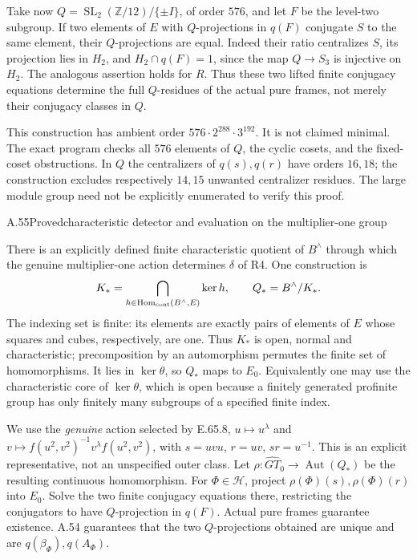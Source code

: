 Take now $Q=\operatorname{SL}_2(\mathbb Z/12)/\{\pm I\}$, of order
$576$, and let $F$ be the level-two subgroup. If two elements of $E$ with
$Q$-projections in $q(F)$ conjugate $S$ to the same element, their
$Q$-projections are equal. Indeed their ratio centralizes $S$, its
projection lies in $H_2$, and
$H_2\cap q(F)=1$, since the map $Q\to S_3$ is injective on $H_2$.
The analogous assertion holds for $R$. Thus these two lifted finite
conjugacy equations determine the full $Q$-residues of the actual pure
frames, not merely their conjugacy classes in $Q$.

This construction has ambient order
$576\cdot2^{288}\cdot3^{192}$. It is not claimed minimal.
The exact program checks all $576$ elements of $Q$, the cyclic cosets,
and the fixed-coset obstructions. In $Q$ the centralizers of $q(s),q(r)$
have orders $16,18$; the construction excludes respectively $14,15$
unwanted centralizer residues. The large module group need not be
explicitly enumerated to verify this proof.

\begin{statement}{A.55}{Proved}{characteristic detector and evaluation on the multiplier-one group}
\end{statement}
There is an explicitly defined finite characteristic quotient of
$B^\wedge$ through which the genuine multiplier-one action determines
$\delta$ of R4. One construction is
\[
 K_* =\bigcap_{h\in\operatorname{Hom}_{\rm cont}(B^\wedge,E)}\ker h,
 \qquad Q_*=B^\wedge/K_*.
\]
The indexing set is finite: its elements are exactly pairs of elements
of $E$ whose squares and cubes, respectively, are one. Thus $K_*$ is
open, normal and characteristic; precomposition by an automorphism
permutes the finite set of homomorphisms. It lies in $\ker\theta$,
so $Q_*$ maps to $E_0$. Equivalently one may use the characteristic core
of $\ker\theta$, which is open because a finitely generated profinite
group has only finitely many subgroups of a specified finite index.

We use the \emph{genuine} action selected by E.65.8,
$u\mapsto u^\lambda$ and
$v\mapsto f(u^2,v^2)^{-1}v^\lambda f(u^2,v^2)$, with
$s=uvu$, $r=uv$, $sr=u^{-1}$.
This is an explicit representative, not an unspecified outer class.
Let $\rho:\widehat{GT}_0\to\operatorname{Aut}(Q_*)$ be the resulting
continuous homomorphism. For $\Phi\in\mathcal H$, project
$\rho(\Phi)(s),\rho(\Phi)(r)$ into $E_0$. Solve the two finite
conjugacy equations there, restricting the conjugators to have
$Q$-projection in $q(F)$. Actual pure frames guarantee existence.
A.54 guarantees that the two $Q$-projections obtained are unique and
are $q(\beta_\Phi),q(A_\Phi)$.

